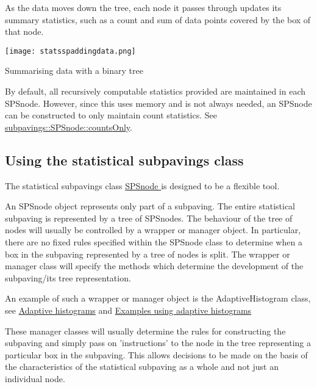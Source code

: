 \-As the data moves down the tree, each node it passes through updates its summary statistics, such as a count and sum of data points covered by the box of that node.

 
\begin{DoxyImage}
\texttt{[image: statsspaddingdata.png]}
\caption{\-Summarising data with a binary tree}
\end{DoxyImage}


\-By default, all recursively computable statistics provided are maintained in each \-S\-P\-Snode. \-However, since this uses memory and is not always needed, an \-S\-P\-Snode can be constructed to \label{StatsSubPavings_SPScountsonly}%
\hypertarget{StatsSubPavings_SPScountsonly}{}%
only maintain count statistics. \-See \hyperlink{classsubpavings_1_1SPSnode_a99af67614faaf93216ec0991e96ddb02}{subpavings\-::\-S\-P\-Snode\-::counts\-Only}.



\hypertarget{StatsSubPavings_statssec_usingStatsClass}{}\subsection{\-Using the statistical subpavings class}\label{StatsSubPavings_statssec_usingStatsClass}
\-The statistical subpavings class \hyperlink{classsubpavings_1_1SPSnode}{\-S\-P\-Snode } is designed to be a flexible tool.

\-An \-S\-P\-Snode object represents only part of a subpaving. \-The entire statistical subpaving is represented by a tree of \-S\-P\-Snodes. \-The behaviour of the tree of nodes will usually be controlled by a wrapper or manager object. \-In particular, there are no fixed rules specified within the \-S\-P\-Snode class to determine when a box in the subpaving represented by a tree of nodes is split. \-The wrapper or manager class will specify the methods which determine the development of the subpaving/its tree representation.

\-An example of such a wrapper or manager object is the \-Adaptive\-Histogram class, see \hyperlink{AdaptiveHistograms}{\-Adaptive histograms} and \hyperlink{AdaptiveHistograms_adhsec_examples}{\-Examples using adaptive histograms}

\-These manager classes will usually determine the rules for constructing the subpaving and simply pass on 'instructions' to the node in the tree representing a particular box in the subpaving. \-This allows decisions to be made on the basis of the characteristics of the statistical subpaving as a whole and not just an individual node.



